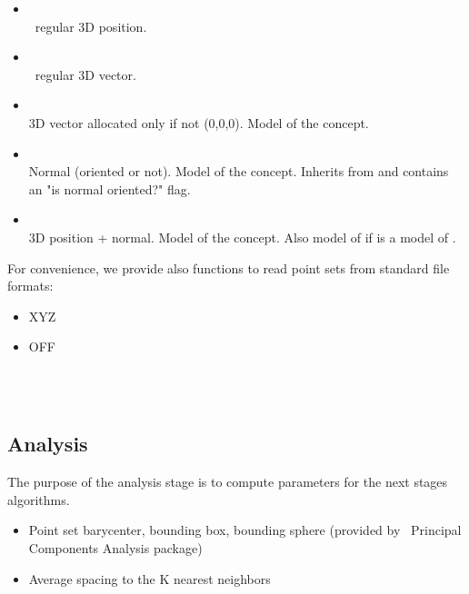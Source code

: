 \begin{itemize}
\item {} \\
\cgal\ regular 3D position.
\item {} \\
\cgal\ regular 3D vector.
\item {} \\
3D vector allocated only if not (0,0,0).
Model of the  concept.
\item {} \\
Normal (oriented or not).
Model of the  concept.
Inherits from  and contains an "is normal oriented?" flag.
\item {} \\
3D position + normal.
Model of the  concept.
Also model of  if  is a model of .
\end{itemize}

For convenience, we provide also functions to read point sets from standard file formats:

\begin{itemize}
\item XYZ
\item OFF
\end{itemize}

  \\
  \\


\subsection{Analysis}

The purpose of the analysis stage is to compute parameters for the next stages algorithms.

\begin{itemize}
\item Point set barycenter, bounding box, bounding sphere (provided by \cgal\ Principal Components Analysis package)
\item Average spacing to the K nearest neighbors
\end{itemize}

